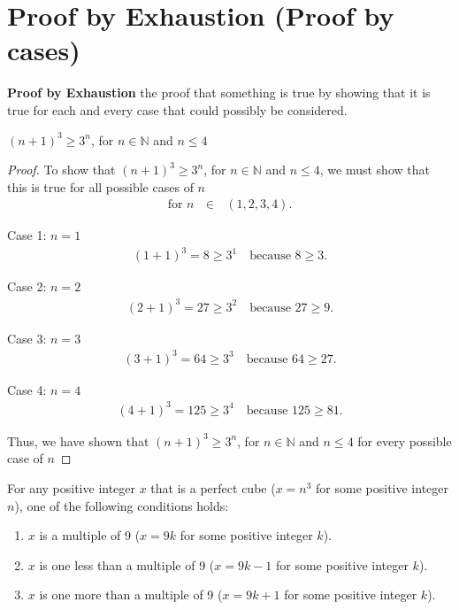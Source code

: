 \documentclass{report}
\begin{document}
    \pagebreak \bigbreak \noindent 
    \section{\LARGE Proof by Exhaustion (Proof by cases)}
    \smallbreak \noindent
    \begin{definition}
        \textbf{Proof by Exhaustion} the proof that something is true by showing that it is true for each and every case that could possibly be considered.
    \end{definition}
    \bigbreak \noindent 
    \begin{remark}
        $(n+1)^{3} \geq 3^{n}$, for $n \in \mathbb{N}$ and $n \leq 4 $
    \end{remark}
    \bigbreak \noindent 
    \begin{proof}
       To show that $(n+1)^{3} \geq 3^{n}$, for $n \in \mathbb{N}$ and $n \leq 4 $, we must show that this is true for all possible cases of $n$ 
       \begin{align*}
           \text{for $n$ $\in$ } (1,2,3,4)
       .\end{align*}
       \bigbreak \noindent 

       Case 1: $n = 1$
    \begin{align*}
        (1+1)^3 = 8 \geq 3^1 \quad \text{because } 8 \geq 3.
    \end{align*}

    Case 2: $n = 2$
    \begin{align*}
        (2+1)^3 = 27 \geq 3^2 \quad \text{because } 27 \geq 9.
    \end{align*}

    Case 3: $n = 3$
    \begin{align*}
        (3+1)^3 = 64 \geq 3^3 \quad \text{because } 64 \geq 27.
    \end{align*}

    Case 4: $n = 4$
    \begin{align*}
        (4+1)^3 = 125 \geq 3^4 \quad \text{because } 125 \geq 81.
    \end{align*}
       \bigbreak \noindent 

       Thus, we have shown that  $(n+1)^{3} \geq 3^{n}$, for $n \in \mathbb{N}$ and $n \leq 4 $ for every possible case of $n$
       \bigbreak \noindent 
       \ep
    \end{proof}
    \pagebreak \bigbreak \noindent 
    \begin{remark}
    For any positive integer \(x\) that is a perfect cube (\(x = n^3\) for some positive integer \(n\)), one of the following conditions holds:
    \begin{enumerate}
        \item \(x\) is a multiple of 9 (\(x = 9k\) for some positive integer \(k\)).
        \item \(x\) is one less than a multiple of 9 (\(x = 9k - 1\) for some positive integer \(k\)).
        \item \(x\) is one more than a multiple of 9 (\(x = 9k + 1\) for some positive integer \(k\)).
    \end{enumerate}
\end{remark}
\end{document}
